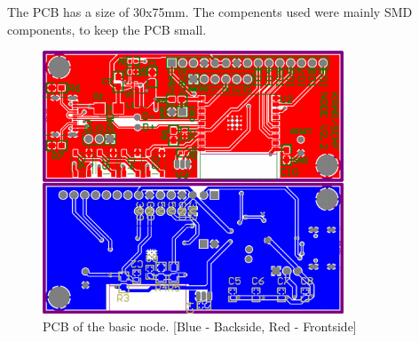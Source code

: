     The PCB has a size of 30x75mm. The compenents used were mainly SMD components, 
    to keep the PCB small. 

    \begin{figure}[H]
        \centering
        \includegraphics[width=0.8\textwidth]{assets/HW/PCB-NODE-V2.2.png}
        \caption{PCB of the basic node. [Blue - Backside, Red - Frontside]}
    \end{figure}	


